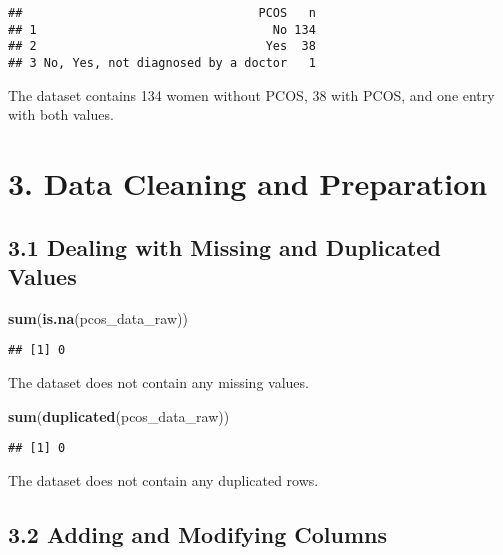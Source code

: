 \documentclass[
]{article}
\newenvironment{Shaded}{\begin{snugshade}}{\end{snugshade}}
\newcommand{\FunctionTok}[1]{\textcolor[rgb]{0.13,0.29,0.53}{\textbf{#1}}}
\newcommand{\NormalTok}[1]{#1}
\newcommand{\SpecialCharTok}[1]{\textcolor[rgb]{0.81,0.36,0.00}{\textbf{#1}}}
\begin{document}
\begin{verbatim}
##                                 PCOS   n
## 1                                 No 134
## 2                                Yes  38
## 3 No, Yes, not diagnosed by a doctor   1
\end{verbatim}

The dataset contains 134 women without PCOS, 38 with PCOS, and one entry
with both values.

\section{3. Data Cleaning and
Preparation}\label{data-cleaning-and-preparation}

\subsection{3.1 Dealing with Missing and Duplicated
Values}\label{dealing-with-missing-and-duplicated-values}

\begin{Shaded}
\begin{Highlighting}[]
\FunctionTok{sum}\NormalTok{(}\FunctionTok{is.na}\NormalTok{(pcos\_data\_raw))}
\end{Highlighting}
\end{Shaded}

\begin{verbatim}
## [1] 0
\end{verbatim}

The dataset does not contain any missing values.

\begin{Shaded}
\begin{Highlighting}[]
\FunctionTok{sum}\NormalTok{(}\FunctionTok{duplicated}\NormalTok{(pcos\_data\_raw))}
\end{Highlighting}
\end{Shaded}

\begin{verbatim}
## [1] 0
\end{verbatim}

The dataset does not contain any duplicated rows.

\subsection{3.2 Adding and Modifying
Columns}\label{adding-and-modifying-columns}

\begin{Shaded}
\end{Shaded}
\end{document}
